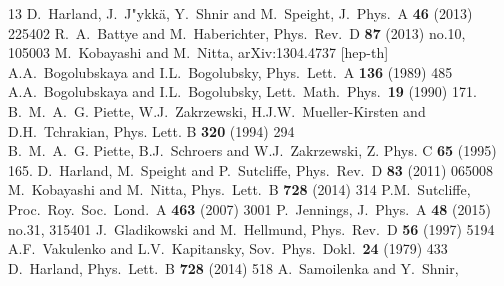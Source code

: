 \documentclass[12pt,a4paper]{article}
\begin{document}
\begin{small}
\begin{thebibliography}{13}
  D.~Harland, J.~J\a"ykk\"a, Y.~Shnir and M.~Speight,
  J.\ Phys.\ A {\bf 46} (2013) 225402
  R.~A.~Battye and M.~Haberichter,
  Phys.\ Rev.\ D {\bf 87} (2013) no.10,  105003
  M.~Kobayashi and M.~Nitta,
  arXiv:1304.4737 [hep-th]
A.A.~Bogolubskaya  and I.L.~Bogolubsky,
Phys.\ Lett.\ A  {\bf 136} (1989) 485\\
A.A.~Bogolubskaya  and I.L.~Bogolubsky,
Lett.\ Math.\ Phys.\  {\bf 19} (1990)  171.
B.~M.~A.~G. Piette, W.J.~Zakrzewski, H.J.W.~Mueller-Kirsten and D.H.~Tchrakian,
Phys. Lett. B  {\bf 320} (1994)  294\\
B.~M.~A.~G. Piette, B.J.~Schroers and W.J.~Zakrzewski,
Z. Phys. C  {\bf 65} (1995) 165.
D.~Harland, M.~Speight and P.~Sutcliffe, Phys.\ Rev.\ D {\bf 83} (2011) 065008
M.~Kobayashi and M.~Nitta, Phys.\ Lett.\ B {\bf 728} (2014) 314
P.M.~Sutcliffe, Proc.\ Roy.\ Soc.\ Lond.\ A {\bf 463} (2007) 3001
P.~Jennings, J.\ Phys.\ A {\bf 48} (2015) no.31,  315401
J.~Gladikowski and M.~Hellmund, Phys.\ Rev.\  D {\bf 56} (1997) 5194
A.F.~Vakulenko and L.V.~Kapitansky, Sov.\ Phys.\ Dokl.\  {\bf 24} (1979) 433
  D.~Harland,
  Phys.\ Lett.\ B {\bf 728} (2014) 518
  A.~Samoilenka and Y.~Shnir,

\end{thebibliography}
\end{small}
\end{document}
